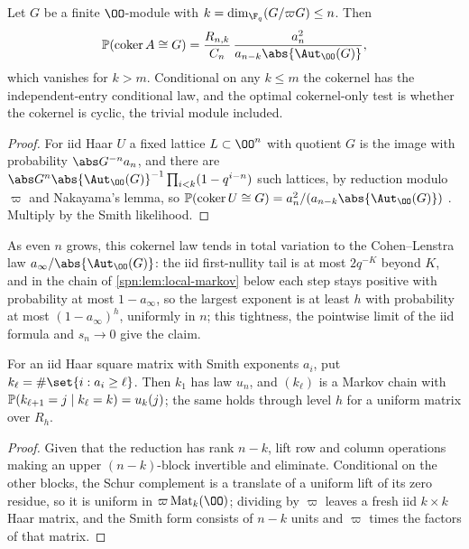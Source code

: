 \begin{corollary}\label{spn:cor:local-cokernel}
Let $G$ be a finite $\OO$-module with $k=\dim_{\F_q}(G/\varpi G)\le n$. Then
\[
 \spnP(\spncoker A\cong G)=\frac{R_{n,k}}{C_n}\,\frac{a_n^2}{a_{n-k}\abs{\Aut_\OO(G)}},
\]
which vanishes for $k>m$. Conditional on any $k\le m$ the cokernel has the independent-entry
conditional law, and the optimal cokernel-only test is whether the cokernel is cyclic, the trivial
module included.
\end{corollary}
\begin{proof}
For iid Haar $U$ a fixed lattice $L\subset\OO^n$ with quotient $G$ is the image with probability
$\abs G^{-n}a_n$, and there are $\abs G^n\abs{\Aut_\OO(G)}^{-1}\prod_{i<k}(1-q^{i-n})$ such lattices, by
reduction modulo $\varpi$ and Nakayama's lemma, so
$\spnP(\spncoker U\cong G)=a_n^2/(a_{n-k}\abs{\Aut_\OO(G)})$ \cite{WangStanley2017Smith}. Multiply by
the Smith likelihood.
\end{proof}

As even $n$ grows, this cokernel law tends in total variation to the Cohen--Lenstra law
$a_\infty/\abs{\Aut_\OO(G)}$: the iid first-nullity tail is at most $2q^{-K}$ beyond $K$, and in the
chain of \cref{spn:lem:local-markov} below each step stays positive with probability at most
$1-a_\infty$, so the largest exponent is at least $h$ with probability at most $(1-a_\infty)^h$,
uniformly in $n$; this tightness, the pointwise limit of the iid formula and $s_n\to0$ give the
claim.

\begin{lemma}\label{spn:lem:local-markov}
For an iid Haar square matrix with Smith exponents $a_i$, put $k_\ell=\#\set{i:a_i\ge\ell}$. Then $k_1$
has law $u_n$, and $(k_\ell)$ is a Markov chain with $\mathbb{P}(k_{\ell+1}=j\mid k_\ell=k)=u_k(j)$; the same
holds through level $h$ for a uniform matrix over $R_h$.
\end{lemma}
\begin{proof}
Given that the reduction has rank $n-k$, lift row and column operations making an upper
$(n-k)$-block invertible and eliminate. Conditional on the other blocks, the Schur complement is a
translate of a uniform lift of its zero residue, so it is uniform in $\varpi\spnMat_k(\OO)$; dividing by
$\varpi$ leaves a fresh iid $k\times k$ Haar matrix, and the Smith form consists of $n-k$ units and
$\varpi$ times the factors of that matrix.
\end{proof}

